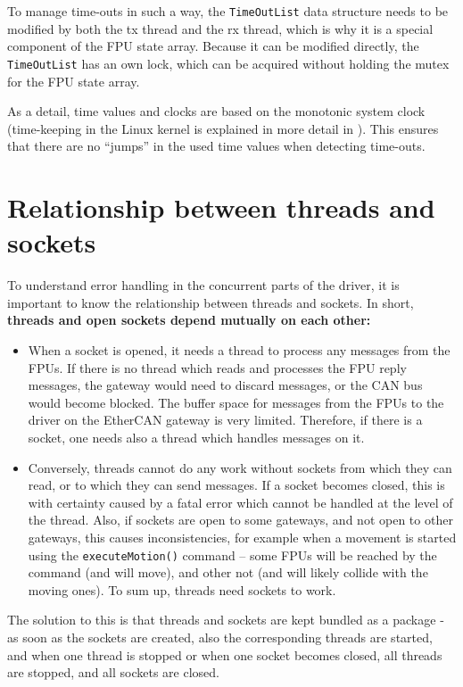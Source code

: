 \documentclass[fontsize=12,a4paper]{scrartcl}
\begin{document}
To manage time-outs in such a way, the \texttt{TimeOutList} data
structure needs to be modified by both the tx thread and the rx
thread, which is why it is a special component of the FPU state
array. Because it can be modified directly, the \texttt{TimeOutList}
has an own lock, which can be acquired without holding the mutex for
the FPU state array.

As a detail, time values and clocks are based on the monotonic system
clock (time-keeping in the Linux kernel is explained in more detail in
\cite[chapter 11]{Love:2013:LSP}). This ensures that there are no
``jumps'' in the used time values when detecting time-outs.

\section{Relationship between threads and sockets}

To understand error handling in the concurrent parts of the driver, it
is important to know the relationship between threads and sockets.
In short, \textbf{threads and open sockets depend mutually on each other:}

\begin{itemize}
\item 
  When a socket is opened, it needs a thread to process
  any messages from the FPUs. If there is no thread
  which reads and processes the FPU reply messages,
  the gateway would need to discard messages,
  or the CAN bus would become blocked. The buffer space
  for messages from the FPUs to the driver on the
  EtherCAN gateway is very limited. Therefore, if there
  is a socket, one needs also a thread which handles
  messages on it.
  
\item Conversely, threads cannot do any work without sockets from
  which they can read, or to which they can send messages.  If a
  socket becomes closed, this is with certainty caused by a fatal
  error which cannot be handled at the level of the thread.  Also, if
  sockets are open to some gateways, and not open to other gateways,
  this causes inconsistencies, for example when a movement is started
  using the \texttt{executeMotion()} command -- some FPUs will be
  reached by the command (and will move), and other not (and will
  likely collide with the moving ones). To sum up, threads need
  sockets to work.

  
\end{itemize}

The solution to this is that threads and sockets are kept bundled as a
package - as soon as the sockets are created, also the corresponding
threads are started, and when one thread is stopped or when one socket
becomes closed, all threads are stopped, and all sockets are closed.
\end{document}
